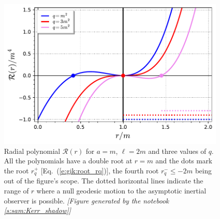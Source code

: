 \begin{figure}
\centerline{
\includegraphics[height=0.28\textheight]{gik_R_a_1_l_2m.pdf} }
\caption[]{\label{f:gik:R_a_1_l_2m} \footnotesize
Radial polynomial $\mathcal{R}(r)$ for $a=m$, $\ell=2m$ and three values of $q$.
All the polynomials have a double root at $r=m$ and
the dots mark the root $r_q^+$ [Eq.~(\ref{e:gik:root_rq})], the fourth root $r_q^- \leq - 2m$ being out of the
figure's scope. The dotted horizontal lines indicate the range of $r$
where a null geodesic motion to the asymptotic inertial observer is possible.
\textsl{[Figure generated by the notebook \ref{s:sam:Kerr_shadow}]}
}
\end{figure}

